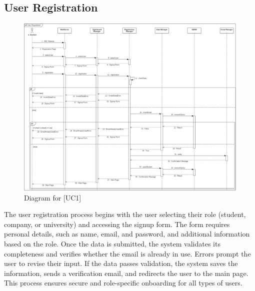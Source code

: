 \subsection{User Registration}
\begin{figure} [H]
    \centering
    \includegraphics[width=1\linewidth]{DD/Images/Runtime Sequence Diagram Images/user_registration.png}
    \caption{Diagram for [UC1]}
    \label{fig: User Registration Diagram}
\end{figure}
The user registration process begins with the user selecting their role (student, company, or university) and accessing the signup form. The form requires personal details, such as name, email, and password, and additional information based on the role. Once the data is submitted, the system validates its completeness and verifies whether the email is already in use. Errors prompt the user to revise their input. If the data passes validation, the system saves the information, sends a verification email, and redirects the user to the main page. This process ensures secure and role-specific onboarding for all types of users.

